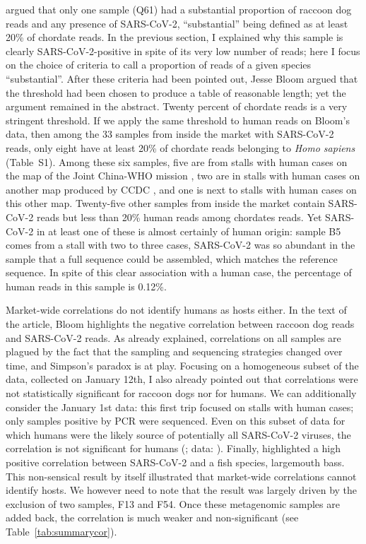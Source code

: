 \documentclass[11pt]{article}
\def \sct {\mbox{SARS-CoV-2}}
\begin{document}
 argued that only one sample (Q61) had a substantial proportion of raccoon dog reads and any presence of \sct{}, ``substantial'' being defined as at least 20\% of chordate reads. In the previous section, I explained why this sample is clearly \sct{}-positive in spite of its very low number of reads; here I focus on the choice of criteria to call a proportion of reads of a given species ``substantial''. After these criteria had been pointed out, Jesse Bloom argued that the threshold had been chosen to produce a table of reasonable length; yet the argument remained in the abstract. Twenty percent of chordate reads is a very stringent threshold. If we apply the same threshold to human reads on Bloom's data, then among the 33 samples from inside the market with \sct{} reads, only eight have at least 20\% of chordate reads belonging to \textit{Homo sapiens} (Table~S1). Among these six samples, five are from stalls with human cases on the map of the Joint China-WHO mission \citep{WHO2021}, two are in stalls with human cases on another map produced by CCDC \citep{Koopmans2021BMJ}, and one is next to stalls with human cases on this other map. Twenty-five other samples from inside the market contain \sct{} reads but less than 20\% human reads among chordates reads. Yet \sct{} in at least one of these is almost certainly of human origin: sample B5 comes from a stall with two to three cases, \sct{} was so abundant in the sample that a full sequence could be assembled, which matches the reference sequence. In spite of this clear association with a human case, the percentage of human reads in this sample is 0.12\%.
 
Market-wide correlations do not identify humans as hosts either. In the text of the article, Bloom highlights the negative correlation between raccoon dog reads and SARS-CoV-2 reads. As already explained, correlations on all samples are plagued by the fact that the sampling and sequencing strategies changed over time, and Simpson's paradox is at play. Focusing on a homogeneous subset of the data, collected on January 12th, I also already pointed out that correlations were not statistically significant for raccoon dogs nor for humans. We can additionally consider the January 1st data: this first trip focused on stalls with human cases; only samples positive by PCR were sequenced. Even on this subset of data for which humans were the likely source of potentially all SARS-CoV-2 viruses, the correlation is not significant for humans (\JBFirstSCHS{}; data: \citet{Bloom2023VE}). Finally, \citet{Bloom2023VE} highlighted a high positive correlation between \sct{} and a fish species, largemouth bass. This non-sensical result by itself illustrated that market-wide correlations cannot identify hosts. We however need to note that the result was largely driven by the exclusion of two samples, F13 and F54. Once these metagenomic samples are added back, the correlation is much weaker and non-significant (see Table~\ref{tab:summarycor}). 
\end{document}
